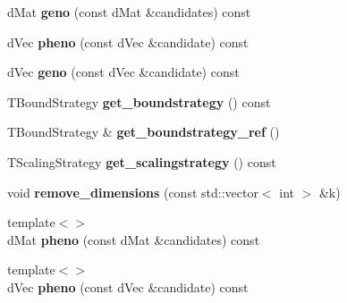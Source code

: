 \begin{DoxyCompactItemize}
\item 
\hypertarget{classlibcmaes_1_1GenoPheno_aa5b36c6f0b48806af87ce202b2427179}{d\+Mat {\bfseries geno} (const d\+Mat \&candidates) const }\label{classlibcmaes_1_1GenoPheno_aa5b36c6f0b48806af87ce202b2427179}

\item 
\hypertarget{classlibcmaes_1_1GenoPheno_adb90d40934c9eb6fd05eff7631734f46}{d\+Vec {\bfseries pheno} (const d\+Vec \&candidate) const }\label{classlibcmaes_1_1GenoPheno_adb90d40934c9eb6fd05eff7631734f46}

\item 
\hypertarget{classlibcmaes_1_1GenoPheno_a8a82e0e53e09403637f9f085b07fa08b}{d\+Vec {\bfseries geno} (const d\+Vec \&candidate) const }\label{classlibcmaes_1_1GenoPheno_a8a82e0e53e09403637f9f085b07fa08b}

\item 
\hypertarget{classlibcmaes_1_1GenoPheno_a40b42ee0fa775d76400e11d77f2ff651}{T\+Bound\+Strategy {\bfseries get\+\_\+boundstrategy} () const }\label{classlibcmaes_1_1GenoPheno_a40b42ee0fa775d76400e11d77f2ff651}

\item 
\hypertarget{classlibcmaes_1_1GenoPheno_a9b4ac739cd4ca680c3d14077e4e10bb4}{T\+Bound\+Strategy \& {\bfseries get\+\_\+boundstrategy\+\_\+ref} ()}\label{classlibcmaes_1_1GenoPheno_a9b4ac739cd4ca680c3d14077e4e10bb4}

\item 
\hypertarget{classlibcmaes_1_1GenoPheno_acd042a925d94dc626e0cb4e52e8d3532}{T\+Scaling\+Strategy {\bfseries get\+\_\+scalingstrategy} () const }\label{classlibcmaes_1_1GenoPheno_acd042a925d94dc626e0cb4e52e8d3532}

\item 
\hypertarget{classlibcmaes_1_1GenoPheno_a261d6e9130487c62bdebd4afc938ac55}{void {\bfseries remove\+\_\+dimensions} (const std\+::vector$<$ int $>$ \&k)}\label{classlibcmaes_1_1GenoPheno_a261d6e9130487c62bdebd4afc938ac55}

\item 
\hypertarget{classlibcmaes_1_1GenoPheno_a3f4c3ea1900be14cb8fa11c306562790}{{\footnotesize template$<$$>$ }\\d\+Mat {\bfseries pheno} (const d\+Mat \&candidates) const}\label{classlibcmaes_1_1GenoPheno_a3f4c3ea1900be14cb8fa11c306562790}

\item 
\hypertarget{classlibcmaes_1_1GenoPheno_abab017b9d581575b81b2e0e09da86d64}{{\footnotesize template$<$$>$ }\\d\+Vec {\bfseries pheno} (const d\+Vec \&candidate) const}\label{classlibcmaes_1_1GenoPheno_abab017b9d581575b81b2e0e09da86d64}


\end{DoxyCompactItemize}

